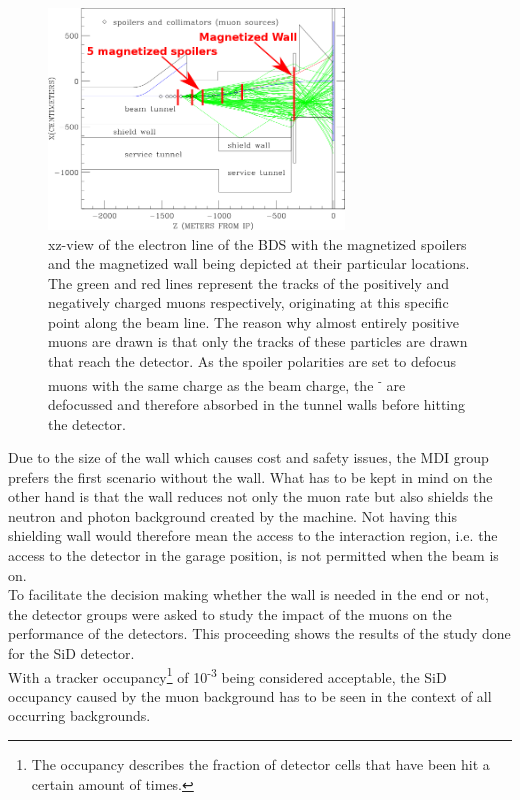 \documentclass[12pt]{article}
\begin{document}
\begin{figure}
    \centering
    \includegraphics[width=0.7\textwidth]{figures/BDS_Tunnel_Spoilers+Wall.png}
    \caption[BDS tunnel with the spoiler and wall positions]{
    xz-view of the electron line of the BDS with the magnetized spoilers and the magnetized wall being depicted at their particular locations.
    The green and red lines represent the tracks of the positively and negatively charged muons respectively, originating at this specific point along the beam line.
    The reason why almost entirely positive muons are drawn is that only the tracks of these particles are drawn that reach the detector.
    As the spoiler polarities are set to defocus muons with the same charge as the beam charge, the \textmu\textsuperscript{-} are defocussed and therefore absorbed in the tunnel walls before hitting the detector.
    }
    \label{fig:Spoilers_Wall_Locations}
\end{figure}

Due to the size of the wall which causes cost and safety issues, the MDI group prefers the first scenario without the wall.
What has to be kept in mind on the other hand is that the wall reduces not only the muon rate but also shields the neutron and photon background created by the machine.
Not having this shielding wall would therefore mean the access to the interaction region, i.e. the access to the detector in the garage position, is not permitted when the beam is on.
\\
To facilitate the decision making whether the wall is needed in the end or not, the detector groups were asked to study the impact of the muons on the performance of the detectors.
This proceeding shows the results of the study done for the SiD detector.\\
With a tracker occupancy\footnote{The occupancy describes the fraction of detector cells that have been hit a certain amount of times.} of 10\textsuperscript{-3} being considered acceptable, the SiD occupancy caused by the muon background has to be seen in the context of all occurring backgrounds.
\end{document}
